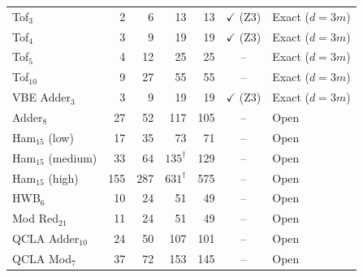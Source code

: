 \begin{table}[t]
\begin{tabular*}{\textwidth}{@{\extracolsep{\fill}}lrrrrcl@{}}
Tof$_3$              & 2   & 6   & 13  & 13  & $\checkmark$ (Z3) & Exact ($d=3m$) \\
Tof$_4$              & 3   & 9   & 19  & 19  & $\checkmark$ (Z3) & Exact ($d=3m$) \\
Tof$_5$              & 4   & 12  & 25  & 25  & --                  & Exact ($d=3m$) \\
Tof$_{10}$           & 9   & 27  & 55  & 55  & --                  & Exact ($d=3m$) \\
VBE Adder$_3$        & 3   & 9   & 19  & 19  & $\checkmark$ (Z3) & Exact ($d=3m$) \\
\midrule
Adder$_8$            & 27  & 52  & 117           & 105 & -- & Open \\
Ham$_{15}$ (low)     & 17  & 35  & 73            & 71  & -- & Open \\
Ham$_{15}$ (medium)  & 33  & 64  & $135^\dagger$ & 129 & -- & Open \\
Ham$_{15}$ (high)    & 155 & 287 & $631^\dagger$ & 575 & -- & Open \\
HWB$_6$              & 10  & 24  & 51            & 49  & -- & Open \\
Mod Red$_{21}$       & 11  & 24  & 51            & 49  & -- & Open \\
QCLA Adder$_{10}$    & 24  & 50  & 107           & 101 & -- & Open \\
QCLA Mod$_7$         & 37  & 72  & 153           & 145 & -- & Open \\
\bottomrule
\end{tabular*}
\end{table}
